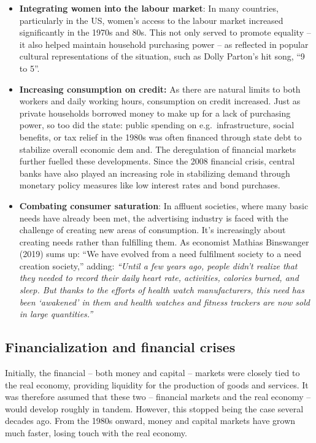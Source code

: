 \documentclass[
  a4paper,
  openany]{book}
\begin{document}
\begin{itemize}
\item
  \textbf{Integrating women into the labour market}: In many countries,
  particularly in the US, women's access to the labour market increased
  significantly in the 1970s and 80s. This not only served to promote
  equality -- it also helped maintain household purchasing power -- as
  reflected in popular cultural representations of the situation, such
  as Dolly Parton's hit song, ``9 to 5''.
\item
  \textbf{Increasing consumption on credit:} As there are natural limits
  to both workers and daily working hours, consumption on credit
  increased. Just as private households borrowed money to make up for a
  lack of purchasing power, so too did the state: public spending on
  e.g.~infrastructure, social benefits, or tax relief in the 1980s was
  often financed through state debt to stabilize overall economic dem
  and. The deregulation of financial markets further fuelled these
  developments. Since the 2008 financial crisis, central banks have also
  played an increasing role in stabilizing demand through monetary
  policy measures like low interest rates and bond purchases.
\item
  \textbf{Combating consumer saturation}: In affluent societies, where
  many basic needs have already been met, the advertising industry is
  faced with the challenge of creating new areas of consumption. It's
  increasingly about creating needs rather than fulfilling them. As
  economist Mathias Binswanger (2019) sums up: ``We have evolved from a
  need fulfilment society to a need creation society,'' adding:
  \emph{``Until a few years ago, people didn't realize that they needed
  to record their daily heart rate, activities, calories burned, and
  sleep. But thanks to the efforts of health watch manufacturers, this
  need has been `awakened' in them and health watches and fitness
  trackers are now sold in large quantities.''}
\end{itemize}

\subsection{Financialization and financial
crises}\label{financialization-and-financial-crises}

Initially, the financial -- both money and capital -- markets were
closely tied to the real economy, providing liquidity for the production
of goods and services. It was therefore assumed that these two --
financial markets and the real economy -- would develop roughly in
tandem. However, this stopped being the case several decades ago. From
the 1980s onward, money and capital markets have grown much faster,
losing touch with the real economy.
\end{document}
